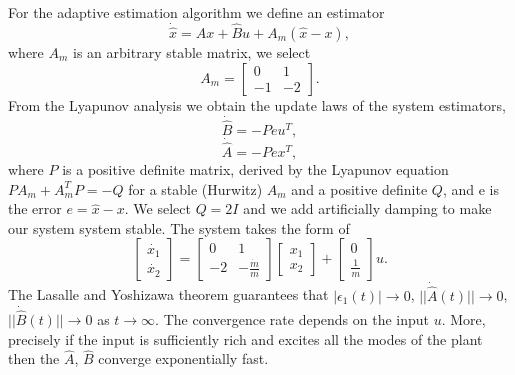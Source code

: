 \documentclass[12pt]{article}
\newenvironment{question}[2][Question]{\begin{trivlist}
\item[\hskip \labelsep {\bfseries #1}\hskip \labelsep {\bfseries #2.}]}{\end{trivlist}}
\begin{document}
\begin{question}{4}\end{question}
For the adaptive estimation algorithm we define an estimator
\begin{equation}
\dot{\hat{x}}= \hat{A}x+\hat{B}u+A_m(\hat{x}-x),
\end{equation} 
where $A_m$ is an arbitrary stable matrix, we select 
\begin{equation*}
A_m = \begin{bmatrix}
0 & 1 \\ 
-1 & -2 
\end{bmatrix}.
\end{equation*}
From the Lyapunov analysis we obtain the update laws of the system estimators,
\begin{equation}
\dot{\hat{B}}= -Peu^T,
\end{equation} 
\begin{equation}
\dot{\hat{A}}= -Pex^T,
\end{equation} 
where $P$ is a positive definite matrix, derived by the Lyapunov equation $PA_m+A_m^TP=-Q$ for a stable (Hurwitz) $A_m$ and a positive definite $Q$, and e is the error $e=\hat{x}-x$. We select $Q=2I$ and we add artificially damping to make our system system stable. The system takes the form of 
\begin{equation}\label{eq_stateSpace}
\begin{bmatrix}
\dot{x_1} \\ \dot{x_2}
\end{bmatrix} = \begin{bmatrix}
0 & 1 \\ -2 & -\frac{\dot{m}}{m}
\end{bmatrix} \begin{bmatrix}
x_1 \\ x_2
\end{bmatrix} + \begin{bmatrix}
0 \\ \frac{1}{m}
\end{bmatrix}u.
\end{equation}
The Lasalle and Yoshizawa theorem guarantees that $|\epsilon_1(t)|\rightarrow 0$, $|| \dot{\hat{A}}(t)||\rightarrow 0$, $|| \dot{\hat{B}}(t)||\rightarrow 0$ as $t \rightarrow \infty$. The convergence rate depends on the input $u$. More, precisely if the input is sufficiently rich and excites all the modes of the plant then the $\hat{A}$, $\hat{B}$ converge exponentially fast. 
\end{document}

